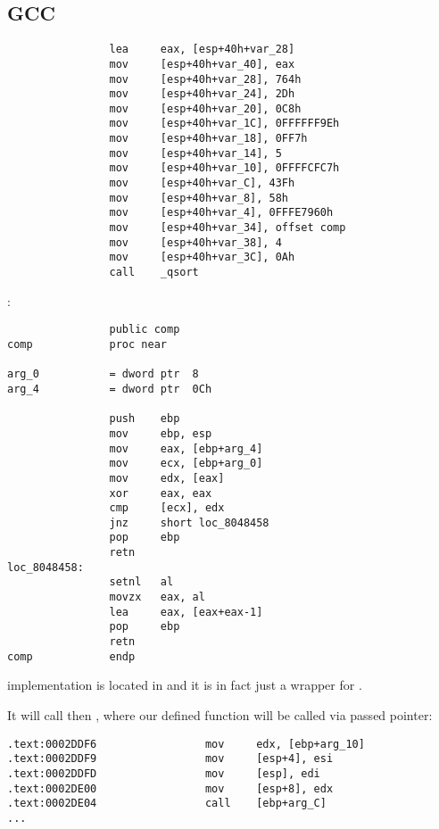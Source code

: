 \subsection{GCC}


\begin{lstlisting}
                lea     eax, [esp+40h+var_28]
                mov     [esp+40h+var_40], eax
                mov     [esp+40h+var_28], 764h
                mov     [esp+40h+var_24], 2Dh
                mov     [esp+40h+var_20], 0C8h
                mov     [esp+40h+var_1C], 0FFFFFF9Eh
                mov     [esp+40h+var_18], 0FF7h
                mov     [esp+40h+var_14], 5
                mov     [esp+40h+var_10], 0FFFFCFC7h
                mov     [esp+40h+var_C], 43Fh
                mov     [esp+40h+var_8], 58h
                mov     [esp+40h+var_4], 0FFFE7960h
                mov     [esp+40h+var_34], offset comp
                mov     [esp+40h+var_38], 4
                mov     [esp+40h+var_3C], 0Ah
                call    _qsort
\end{lstlisting}

:

\begin{lstlisting}
                public comp
comp            proc near

arg_0           = dword ptr  8
arg_4           = dword ptr  0Ch

                push    ebp
                mov     ebp, esp
                mov     eax, [ebp+arg_4]
                mov     ecx, [ebp+arg_0]
                mov     edx, [eax]
                xor     eax, eax
                cmp     [ecx], edx
                jnz     short loc_8048458
                pop     ebp
                retn
loc_8048458:
                setnl   al
                movzx   eax, al
                lea     eax, [eax+eax-1]
                pop     ebp
                retn
comp            endp
\end{lstlisting}

{\qsort implementation is located in  and it is in fact just a wrapper for .}

{It will call then , where our defined function will be called via passed pointer:}


\begin{lstlisting}
.text:0002DDF6                 mov     edx, [ebp+arg_10]
.text:0002DDF9                 mov     [esp+4], esi
.text:0002DDFD                 mov     [esp], edi
.text:0002DE00                 mov     [esp+8], edx
.text:0002DE04                 call    [ebp+arg_C]
...
\end{lstlisting}
